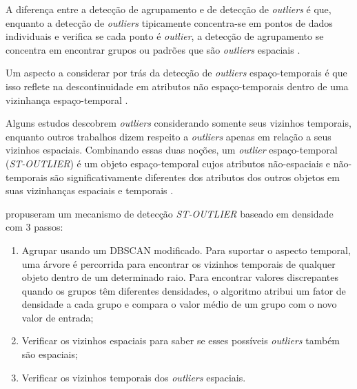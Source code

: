 A diferença entre a detecção de agrupamento e de detecção de \textit{outliers} é que, enquanto a detecção de \textit{outliers} tipicamente concentra-se em pontos de dados individuais e verifica se cada ponto é \textit{outlier}, a detecção de agrupamento se concentra em encontrar grupos ou padrões que são \textit{outliers} espaciais \cite{DanielNeill2006}.

Um aspecto a considerar por trás da detecção de \textit{outliers} espaço-temporais é que isso reflete na descontinuidade em atributos não espaço-temporais dentro de uma vizinhança espaço-temporal \cite{cheng:2014}.

Alguns estudos descobrem \textit{outliers} considerando somente seus vizinhos temporais, enquanto outros trabalhos dizem respeito a \textit{outliers} apenas em relação a seus vizinhos espaciais. Combinando essas duas noções, um \textit{outlier} espaço-temporal (\textit{\acrshort{ST-OUTLIER}}) é um objeto espaço-temporal cujos atributos não-espaciais e não-temporais são significativamente diferentes dos atributos dos outros objetos em suas vizinhanças espaciais e temporais \cite{gupta:2014}.

\cite{Birant2006SpatiotemporalOD} propuseram um mecanismo de detecção \textit{\acrshort{ST-OUTLIER}} baseado em densidade com 3 passos:
\begin{enumerate}
    \item Agrupar usando um \acrshort{DBSCAN} modificado. Para suportar o aspecto temporal, uma árvore é percorrida para encontrar
os vizinhos temporais de qualquer objeto dentro de um determinado raio. Para encontrar valores discrepantes quando os grupos têm diferentes densidades, o algoritmo atribui um fator de densidade a cada grupo e compara o valor médio de um grupo com o novo valor de entrada;
    \item Verificar os vizinhos espaciais para saber se esses possíveis \textit{outliers} também são espaciais;
    \item Verificar os vizinhos temporais dos \textit{outliers} espaciais.
\end{enumerate}
